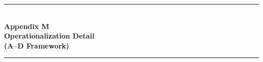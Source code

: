 \documentclass[12pt,a4paper,oneside]{report}
\newcommand{\chaptertitlepage}[1]{%
  \clearpage
  \thispagestyle{empty}%
  \mbox{}%
  \clearpage
  \thispagestyle{empty}%
  \vspace*{\fill}%
  \begin{center}%
    {\color{ggugold}\rule{0.6\textwidth}{1.5pt}}\\[1.5cm]%
    {\Huge\bfseries\color{ggunavy}#1}\\[1.5cm]%
    {\color{ggugold}\rule{0.6\textwidth}{0.8pt}}%
  \end{center}%
  \vspace*{\fill}%
  \clearpage
  \thispagestyle{plain}%
}
\providecommand{\backmatter}{%
  \cleardoublepage
}
\begin{document}
\chaptertitlepage{Appendix M\\[0.5cm]Operationalization Detail\\(A--D Framework)}
\label{chap:appendix_operationalization_detail}












% 
% 
% 
% 
% 


\backmatter
\end{document}
